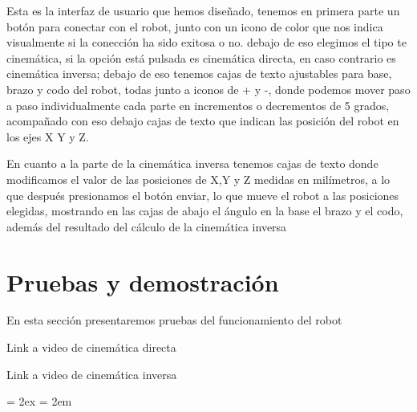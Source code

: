 \documentclass[11pt]{article}
\begin{document}
Esta es la interfaz de usuario que hemos diseñado, tenemos en primera parte un botón para conectar con el robot, junto con un icono de color que nos indica visualmente si la conección ha sido exitosa o no. debajo de eso elegimos el tipo te cinemática, si la opción está pulsada es cinemática directa, en caso contrario es cinemática inversa; debajo de eso tenemos cajas de texto ajustables para base, brazo y codo del robot, todas junto a iconos de + y -, donde podemos mover paso a paso individualmente cada parte en incrementos o decrementos de 5 grados, acompañado con eso debajo cajas de texto que indican las posición del robot en los ejes X Y y Z.

En cuanto a la parte de la cinemática inversa tenemos cajas de texto donde modificamos el valor de las posiciones de X,Y y Z medidas en milímetros, a lo que después presionamos el botón enviar, lo que mueve el robot a las posiciones elegidas, mostrando en las cajas de abajo el ángulo en la base el brazo y el codo, además del resultado del cálculo de la cinemática inversa
\section{Pruebas y demostración}
\label{sec:pruebas}
En esta sección presentaremos pruebas del funcionamiento del robot

Link a video de cinemática directa


Link a video de cinemática inversa




\bibitemsep = 2ex
\bibhang = 2em


\end{document}
